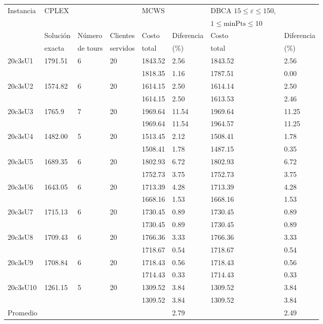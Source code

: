 \documentclass[letter, 10pt]{article}
\begin{document}
\begin{itemize}
\bigskip
\begin{tabular}{|l|lll|ll|ll|}
\hline
Instancia & CPLEX &&&MCWS&&DBCA \(15 \leq \varepsilon \leq 150,\) &\\ 
			&	&&&&& \(1 \leq \mbox{minPts} \leq 10\)& \\ \hline
		& Solución  & Número & Clientes & Costo  & Diferencia & Costo & Diferencia \\
		& exacta		& de tours 	& servidos & total & (\%)&total & (\%)\\ \hline
20c3sU1 & 1791.51 & 6 & 20 & 1843.52 & 2.56 & 1843.52 & 2.56 \\
		&			&	&	&1818.35 & 1.16 & 1787.51 & 0.00 \\ \hline
20c3sU2 & 1574.82 & 6 & 20 & 1614.15 & 2.50 & 1614.14 & 2.50 \\
		&			&	&	&1614.15 & 2.50 & 1613.53 & 2.46 \\\hline
20c3sU3 & 1765.9 & 7 & 20 & 1969.64 & 11.54 & 1969.64 &11.25 \\
		&			&	&	&1969.64 & 11.54 & 1964.57 &11.25 \\	\hline			
20c3sU4 & 1482.00 & 5 & 20 & 1513.45 & 2.12 & 1508.41 & 1.78 \\
		&			&	&	&1508.41 & 1.78 & 1487.15 & 0.35 \\\hline
20c3sU5 & 1689.35 & 6 & 20 & 1802.93 & 6.72 & 1802.93 & 6.72 \\
		&			&	&	&1752.73 & 3.75 & 1752.73 & 3.75 \\	\hline
20c3sU6 & 1643.05 & 6 & 20 & 1713.39 & 4.28 & 1713.39 & 4.28 \\
		&			&	&	&1668.16 & 1.53 & 1668.16 & 1.53 \\\hline
20c3sU7 & 1715.13 & 6 & 20 & 1730.45 & 0.89 & 1730.45 & 0.89 \\
		&			&	&	&1730.45 & 0.89 & 1730.45 & 0.89 \\\hline
20c3sU8 & 1709.43 & 6 & 20 & 1766.36 & 3.33 & 1766.36 & 3.33 \\
		&			&	&	&1718.67 & 0.54 & 1718.67 & 0.54 \\\hline
20c3sU9 & 1708.84 & 6 & 20 & 1718.43 & 0.56 & 1718.43 & 0.56 \\
		&			&	&	&1714.43 & 0.33 & 1714.43 & 0.33 \\\hline
20c3sU10& 1261.15 & 5 & 20 & 1309.52 & 3.84 & 1309.52 & 3.84 \\
		&			&	&	&1309.52 & 3.84 & 1309.52 & 3.84 \\\hline
Promedio & &&&& 2.79 &&2.49 \\ \hline										
\end{tabular}


\end{itemize}
\end{document}
